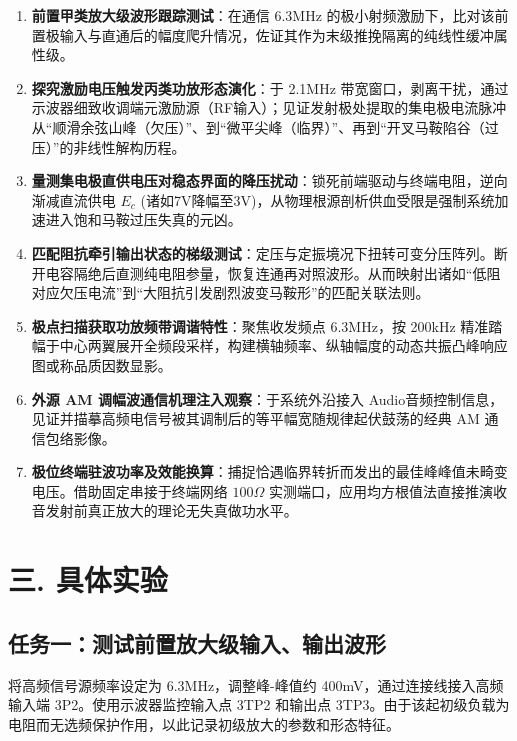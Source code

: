 \documentclass[12pt]{article}
\begin{document}
\vspace{1em}
\begin{enumerate}
    \item[(1)] \textbf{前置甲类放大级波形跟踪测试}：在通信 6.3MHz 的极小射频激励下，比对该前置极输入与直通后的幅度爬升情况，佐证其作为末级推挽隔离的纯线性缓冲属性级。
    \item[(2)] \textbf{探究激励电压触发丙类功放形态演化}：于 2.1MHz 带宽窗口，剥离干扰，通过示波器细致收调端元激励源（RF输入）；见证发射极处提取的集电极电流脉冲从“顺滑余弦山峰（欠压）”、到“微平尖峰（临界）”、再到“开叉马鞍陷谷（过压）”的非线性解构历程。
    \item[(3)] \textbf{量测集电极直供电压对稳态界面的降压扰动}：锁死前端驱动与终端电阻，逆向渐减直流供电 $E_c$ (诸如7V降幅至3V)，从物理根源剖析供血受限是强制系统加速进入饱和马鞍过压失真的元凶。
    \item[(4)] \textbf{匹配阻抗牵引输出状态的梯级测试}：定压与定振境况下扭转可变分压阵列。断开电容隔绝后直测纯电阻参量，恢复连通再对照波形。从而映射出诸如“低阻对应欠压电流”到“大阻抗引发剧烈波变马鞍形”的匹配关联法则。
    \item[(5)] \textbf{极点扫描获取功放频带调谐特性}：聚焦收发频点 6.3MHz，按 200kHz 精准踏幅于中心两翼展开全频段采样，构建横轴频率、纵轴幅度的动态共振凸峰响应图或称品质因数显影。
    \item[(6)] \textbf{外源 AM 调幅波通信机理注入观察}：于系统外沿接入 Audio音频控制信息，见证并描摹高频电信号被其调制后的等平幅宽随规律起伏鼓荡的经典 AM 通信包络影像。
    \item[(7)] \textbf{极位终端驻波功率及效能换算}：捕捉恰遇临界转折而发出的最佳峰峰值未畸变电压。借助固定串接于终端网络 $100\Omega$ 实测端口，应用均方根值法直接推演收音发射前真正放大的理论无失真做功水平。
\end{enumerate}

\section*{三. 具体实验}

\subsection*{任务一：测试前置放大级输入、输出波形}

将高频信号源频率设定为 6.3MHz，调整峰-峰值约 400mV，通过连接线接入高频输入端 3P2。使用示波器监控输入点 3TP2 和输出点 3TP3。由于该起初级负载为电阻而无选频保护作用，以此记录初级放大的参数和形态特征。
\end{document}
